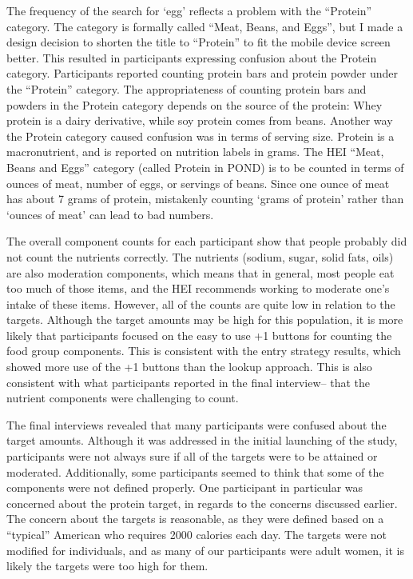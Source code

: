 The frequency of the search for `egg' reflects a problem with the ``Protein'' category. The category is formally called ``Meat, Beans, and Eggs'', but I made a design decision to shorten the title to ``Protein'' to fit the mobile device screen better. This resulted in participants expressing confusion about the Protein category. Participants reported counting protein bars and protein powder under the ``Protein'' category. The appropriateness of counting protein bars and powders in the Protein category depends on the source of the protein: Whey protein is a dairy derivative, while soy protein comes from beans. Another way the Protein category caused confusion was in terms of serving size. Protein is a macronutrient, and is reported on nutrition labels in grams. The HEI ``Meat, Beans and Eggs'' category (called Protein in POND) is to be counted in terms of ounces of meat, number of eggs, or servings of beans. Since one ounce of meat has about 7 grams of protein, mistakenly counting `grams of protein' rather than `ounces of meat' can lead to bad numbers. 

The overall component counts for each participant show that people probably did not count the nutrients correctly. The nutrients (sodium, sugar, solid fats, oils) are also moderation components, which means that in general, most people eat too much of those items, and the HEI recommends working to moderate one's intake of these items. However, all of the counts are quite low in relation to the targets. Although the target amounts may be high for this population, it is more likely that participants focused on the easy to use +1 buttons for counting the food group components. This is consistent with the entry strategy results, which showed more use of the +1 buttons than the lookup approach. This is also consistent with what participants reported in the final interview-- that the nutrient components were challenging to count. 

The final interviews revealed that many participants were confused about the target amounts. Although it was addressed in the initial launching of the study, participants were not always sure if all of the targets were to be attained or moderated. Additionally, some participants seemed to think that some of the components were not defined properly. One participant in particular was concerned about the protein target, in regards to the concerns discussed earlier. The concern about the targets is reasonable, as they were defined based on a ``typical'' American who requires 2000 calories each day. The targets were not modified for individuals, and as many of our participants were adult women, it is likely the targets were too high for them. 


